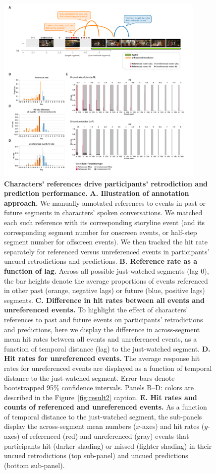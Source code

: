 \documentclass[10pt]{article}
\begin{document}
\begin{figure}[tp]
  \centering
  \includegraphics[width=0.9\textwidth]{results3}
  \caption{\textbf{Characters' references drive participants' retrodiction and prediction performance.}  \textbf{A. Illustration of annotation approach.}  We manually annotated references to events in past or future segments in characters' spoken conversations.  We matched each such reference with its corresponding storyline event (and its corresponding segment number for onscreen events, or half-step segment number for offscreen events).  We then tracked the hit rate separately for referenced versus unreferenced events in participants' uncued retrodictions and predictions.  \textbf{B. Reference rate as a function of lag.}  Across all possible just-watched segments (lag 0), the bar heights denote the average proportions of events referenced in other past (orange, negative lags) or future (blue, positive lags) segments.  \textbf{C. Difference in hit rates between all events and unreferenced events.}  To highlight the effect of characters' references to past and future events on participants' retrodictions and predictions, here we display the difference in across-segment mean hit rates between all events and unreferenced events, as a function of temporal distance (lag) to the just-watched segment.  \textbf{D. Hit rates for unreferenced events.}  The average response hit rates for unreferenced events are displayed as a function of temporal distance to the just-watched segment.  Error bars denote bootstrapped 95\% confidence intervals.  Panels B--D: colors are described in the Figure~\ref{fig:result2} caption.  \textbf{E.  Hit rates and counts of referenced and unreferenced events.}  As a function of temporal distance to the just-watched segment, the sub-panels display the across-segment mean numbers ($x$-axes) and hit rates ($y$-axes) of referenced (red) and unreferenced (gray) events that participants hit (darker shading) or missed (lighter shading) in their uncued retrodictions (top sub-panel) and uncued predictions (bottom sub-panel).}
  \label{fig:result3}
\end{figure}
\end{document}
